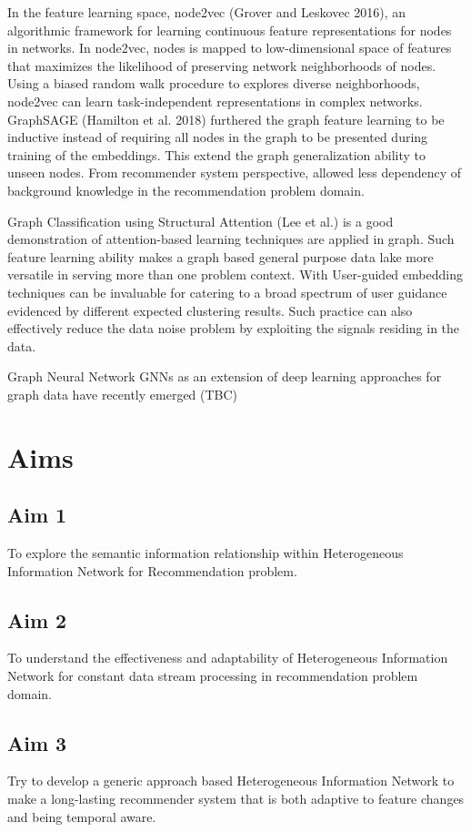 \documentclass[12pt,a4 paper,title page]{article}
\begin{document}
In the feature learning space, node2vec (Grover and Leskovec 2016), an algorithmic framework for learning continuous feature representations for nodes in networks. In node2vec, nodes is mapped to low-dimensional space of features that maximizes the likelihood of preserving network neighborhoods of nodes. Using a biased random walk procedure to explores diverse neighborhoods, node2vec can learn task-independent representations in complex networks. GraphSAGE (Hamilton et al. 2018) furthered the graph feature learning to be inductive instead of requiring all nodes in the graph to be presented during training of the embeddings. This extend the graph generalization ability to unseen nodes. From recommender system perspective, allowed less dependency of background knowledge in the recommendation problem domain.  

Graph Classification using Structural Attention (Lee et al.) is a good demonstration of attention-based learning techniques are applied in graph. Such feature learning ability makes a graph based general purpose data lake more versatile in serving more than one problem context. With User-guided embedding techniques can be invaluable for catering to a broad spectrum of user guidance evidenced by different expected clustering results. Such practice can also effectively reduce the data noise problem by exploiting the signals residing in the data.  

Graph Neural Network GNNs as an extension of deep learning approaches for graph data have recently emerged (TBC)

\section{Aims}
\subsection{Aim 1}
To explore the semantic information relationship within Heterogeneous Information Network for Recommendation problem.

\subsection{Aim 2}
To understand the effectiveness and adaptability of Heterogeneous Information Network for constant data stream processing in recommendation problem domain. 

\subsection{Aim 3}
Try to develop a generic approach based Heterogeneous Information Network to make a long-lasting recommender system that is both adaptive to feature changes and being temporal aware. 
\end{document}
